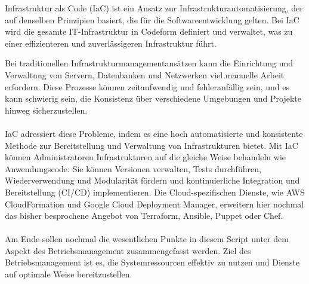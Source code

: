 Infrastruktur als Code (IaC) ist ein Ansatz zur Infrastrukturautomatisierung, der auf denselben Prinzipien basiert, die für die Softwareentwicklung gelten. Bei IaC wird die gesamte IT-Infrastruktur in Codeform definiert und verwaltet, was zu einer effizienteren und zuverlässigeren Infrastruktur führt.

Bei traditionellen Infrastrukturmanagementansätzen kann die Einrichtung und Verwaltung von Servern, Datenbanken und Netzwerken viel manuelle Arbeit erfordern. Diese Prozesse können zeitaufwendig und fehleranfällig sein, und es kann schwierig sein, die Konsistenz über verschiedene Umgebungen und Projekte hinweg sicherzustellen.
\\\\
IaC adressiert diese Probleme, indem es eine hoch automatisierte und konsistente Methode zur Bereitstellung und Verwaltung von Infrastrukturen bietet. Mit IaC können Administratoren Infrastrukturen auf die gleiche Weise behandeln wie Anwendungscode: Sie können Versionen verwalten, Tests durchführen, Wiederverwendung und Modularität fördern und kontinuierliche Integration und Bereitstellung (CI/CD) implementieren.
Die Cloud-spezifischen Dienste, wie AWS CloudFormation und Google Cloud Deployment Manager, erweitern hier nochmal das bisher besprochene Angebot von Terraform, Ansible, Puppet oder Chef.
\\\\ 
Am Ende sollen nochmal die wesentlichen Punkte in diesem Script unter dem Aspekt des Betriebsmanagement zusammengefasst werden. Ziel des Betriebsmanagement ist es, die Systemressourcen effektiv zu nutzen und Dienste auf optimale Weise bereitzustellen.

